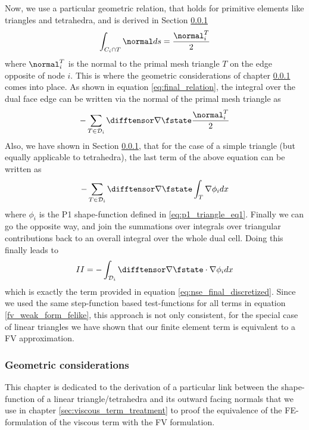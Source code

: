 \documentclass[../main.tex]{subfiles}
\begin{document}
Now, we use a particular geometric relation, that holds for primitive elements like triangles and tetrahedra, and is  derived in Section \ref{sec:geometric_considerations}
\begin{align}
  \int_{C_i\cap T} \normal ds = \frac{\normal_i^T}{2}
\end{align}
where $\normal_i^T$ is the normal to the primal mesh triangle $T$ on the edge opposite of node $i$.
This is where the geometric considerations of chapter \ref{sec:geometric_considerations} comes into place. As shown in equation \eqref{eq:final_relation}, the integral over the dual face edge can be written via the normal of the primal mesh triangle as
\begin{align}
  -\sum_{T\in\mathcal{D}_i} \difftensor \nabla\fstate \frac{\normal_i^T}{2}
\end{align}
Also, we have shown in Section \ref{sec:geometric_considerations}, that for the case of a simple triangle (but equally applicable to tetrahedra), the last term of the above equation can be written as
\begin{align}
  -\sum_{T\in\mathcal{D}_i} \difftensor \nabla\fstate \int_T \nabla \phi_i dx
\end{align}
where $\phi_i$ is the P1 shape-function defined in \eqref{eq:p1_triangle_eq1}.
Finally we can go the opposite way, and join the summations over integrals over triangular contributions back to an overall integral over the whole dual cell. Doing this finally leads to
\begin{align}
  II = -\int_{\mathcal{D}_i} \difftensor \nabla\fstate\cdot\nabla \phi_i dx
\end{align}
which is exactly the term provided in equation \eqref{eq:nse_final_discretized}.
Since we used the same step-function based test-functions for all terms in equation \eqref{fv_weak_form_felike}, this approach is not only consistent, for the special case of linear triangles we have shown that our finite element term is equivalent to a FV approximation.



\subsubsection{Geometric considerations}\label{sec:geometric_considerations}
This chapter is dedicated to the derivation of a particular link between the shape-function of a linear triangle/tetrahedra and its outward facing normals that we use in chapter \ref{sec:viscous_term_treatment} to proof the equivalence of the \ac{FE}-formulation of the viscous term with the \ac{FV} formulation.
\end{document}
